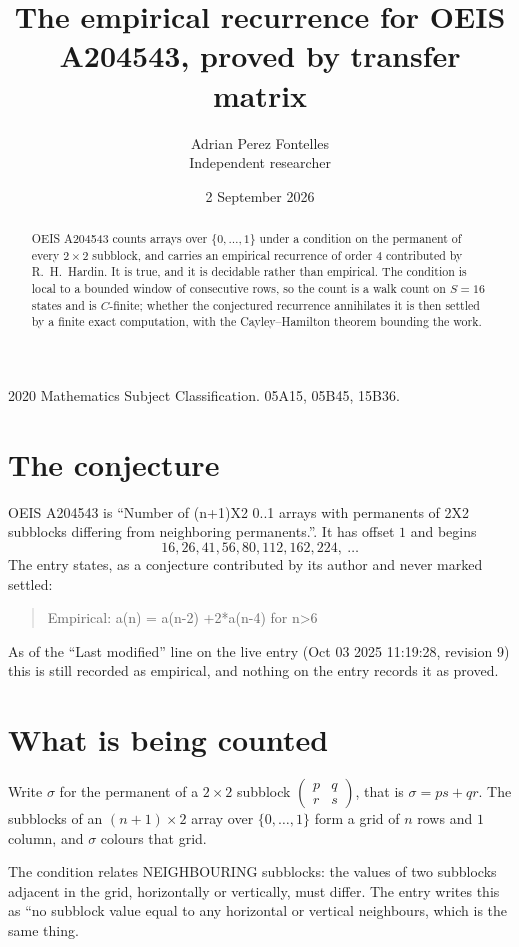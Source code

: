 \documentclass[11pt,a4paper]{article}
\title{The empirical recurrence for OEIS A204543, proved by transfer matrix}
\author{Adrian Perez Fontelles\\ \small Independent researcher}
\date{2 September 2026}
\theoremstyle{plain}
\theoremstyle{definition}
\begin{document}
\maketitle

\begin{abstract}
OEIS A204543 counts arrays over $\{0,\dots,1\}$ under a condition on the permanent of every
$2\times2$ subblock, and carries an empirical recurrence of order $4$ contributed by
R.~H.~Hardin. It is true, and it is decidable rather than empirical. The condition is local to
a bounded window of consecutive rows, so the count is a walk count on $S=16$ states and is
$C$-finite; whether the conjectured recurrence annihilates it is then settled by a finite exact
computation, with the Cayley--Hamilton theorem bounding the work.
\end{abstract}

\noindent\small 2020 Mathematics Subject Classification. 05A15, 05B45, 15B36.\normalsize

\section{The conjecture}

OEIS A204543 is ``Number of (n+1)X2 0..1 arrays with permanents of 2X2 subblocks differing from neighboring permanents.''. It has offset $1$ and begins
\[
16, 26, 41, 56, 80, 112, 162, 224,\ \dots
\]
The entry states, as a conjecture contributed by its author and never marked settled:
\begin{quote}
Empirical: a(n) = a(n-2) +2*a(n-4) for n>6
\end{quote}
As of the ``Last modified'' line on the live entry (Oct 03 2025 11:19:28, revision 9) this is still
recorded as empirical, and nothing on the entry records it as proved.

\section{What is being counted}

Write $\sigma$ for the permanent of a $2\times2$ subblock
$\begin{pmatrix}p&q\\r&s\end{pmatrix}$, that is $\sigma=ps+qr$. The subblocks of an
$(n+1)\times2$ array over $\{0,\dots,1\}$ form a grid of $n$ rows and $1$
column, and $\sigma$ colours that grid.

The condition relates NEIGHBOURING subblocks: the values of two subblocks adjacent in the grid,
horizontally or vertically, must differ. The entry writes this as ``no subblock value equal to any horizontal or vertical neighbours, which is the same thing.
\end{document}

